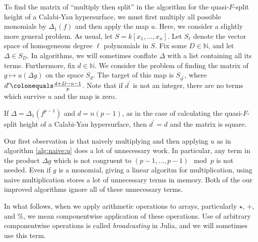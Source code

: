 \newcommand{\triv}{\texttt{TRIV}}
\newcommand{\merge}{\texttt{MERGE}}
\newcommand{\wics}{\texttt{WICS}}

To find the matrix of ``multiply then split''
in the algorithm for the quasi-\(F\)-split height
of a Calabi-Yau hypersurface, 
we must first multiply all possible 
monomials by \(\Delta_{1}(f)\) 
and then apply the map \(u\).
Here, we consider a slightly more general problem.
As usual, let \(S = k[x_{1}, \ldots, x_{n}]\).
Let $S_\ell$ denote the vector space of homogeneous degree $\ell$ polynomials in \(S\).
Fix some \(D \in \mathbb{N}\), and let \(\Delta \in S_D\).
In algorithms, we will sometimes conflate \(\Delta\) 
with a list containing all its terms.
Furthermore, fix \(d \in \mathbb{N}\).
We consider the problem of finding the matrix of 
\(g \mapsto u(\Delta g)\)
on the space \(S_{d}\).
The target of this map is
\(S_{d^{\prime}}\), where
\(d^{\prime} \colonequals \frac{d+D-n-1}{p}\).
Note that if \(d^{\prime}\) is not an integer,
there are no terms which survive \(u\) and
the map is zero.

\begin{rmk}
    If \(\Delta = \Delta_{1}(f^{p-1})\) and \(d = n(p-1)\),
	as in the case of calculating the quasi-\(F\)-split
	height of a Calabi-Yau hypersurface, 
	then \(d^{\prime} = d\) and the matrix is 
	square.
\end{rmk}

Our first observation is that naively 
multiplying and then applying \(u\) 
as in algorithm \ref{alg:naive:u}
does a lot of unnecessary work.
In particular, any term in the 
product \(\Delta g\) which 
is not congruent to 
\((p-1, \ldots, p-1) \mod p\)
is not needed. 
Even if \(g\) is a monomial, giving a linear
algoritm for multiplication, using naive
multiplication stores a lot of unnecessary terms
in memory.
Both of the our improved algorithms ignore
all of these unnecessary terms.

In what follows, 
when we apply arithmetic operations to arrays, 
particularly \(\star\), \(+\), and \(\%\),
we mean componentwise application of these operations.
Use of arbitrary componentwise operations is called
\textit{broadcasting} in Julia, and we will
sometimes use this term.

